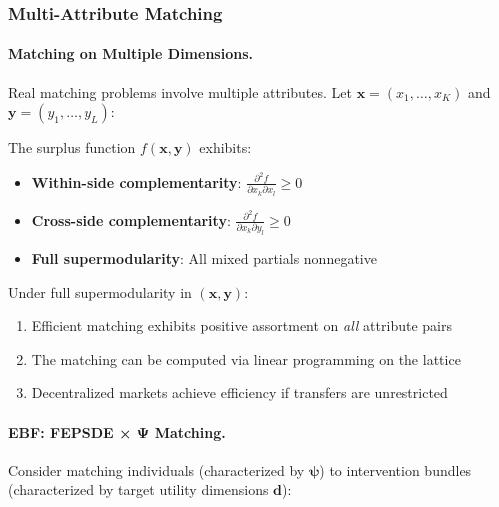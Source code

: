 \subsubsection{Multi-Attribute Matching}

\paragraph{Matching on Multiple Dimensions.}

Real matching problems involve multiple attributes. Let $\mathbf{x} = (x_1, \ldots, x_K)$ 
and $\mathbf{y} = (y_1, \ldots, y_L)$:

\begin{definition}
\label{def:multi-attr}
The surplus function $f(\mathbf{x}, \mathbf{y})$ exhibits:
\begin{itemize}
    \item \textbf{Within-side complementarity}: $\frac{\partial^2 f}{\partial x_k \partial x_l} \geq 0$
    \item \textbf{Cross-side complementarity}: $\frac{\partial^2 f}{\partial x_k \partial y_l} \geq 0$
    \item \textbf{Full supermodularity}: All mixed partials nonnegative
\end{itemize}
\end{definition}

\begin{proposition}
\label{prop:multi-assort}
Under full supermodularity in $(\mathbf{x}, \mathbf{y})$:
\begin{enumerate}
    \item Efficient matching exhibits positive assortment on \emph{all} attribute pairs
    \item The matching can be computed via linear programming on the lattice
    \item Decentralized markets achieve efficiency if transfers are unrestricted
\end{enumerate}
\end{proposition}

\paragraph{EBF: FEPSDE × Ψ Matching.}

Consider matching individuals (characterized by $\boldsymbol{\psi}$) to intervention 
bundles (characterized by target utility dimensions $\mathbf{d}$):


